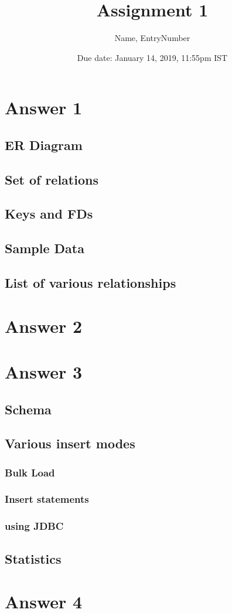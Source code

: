 \documentclass[10pt]{article}
\title{Assignment 1}
\author {Name, EntryNumber}
\date{Due date: January 14, 2019, 11:55pm IST}
\begin{document}
\maketitle

\section{Answer 1}
\subsection{ER Diagram}
\subsection{Set of relations}
\subsection{Keys and FDs}
\subsection{Sample Data}
\subsection{List of various relationships}

\section{Answer 2}

\section{Answer 3}
\subsection{Schema}
\subsection{Various insert modes}
\subsubsection{Bulk Load}
\subsubsection{Insert statements}
\subsubsection{using JDBC}
\subsection{Statistics}

\section{Answer 4}
\end{document}
